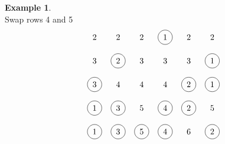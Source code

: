 \documentclass[reqno]{amsart}
\newcommand{\0}{\phantom{c}}
\theoremstyle{plain}
\theoremstyle{definition}
\newtheorem{example}[thm]{Example}
\numberwithin{equation}{section}
\begin{document}
\begin{example}
\[\]
Swap rows 4 and 5
\[
\begin{tikzpicture}\node at (0, 5){2};\node at (1, 5){2};\node at (2, 5){2};\node[circle, draw=black] at (3, 5){1};\node at (4, 5){2};\node at (5, 5){2};\node at (0, 4){3};\node[circle, draw=black] at (1, 4){2};\node at (2, 4){3};\node at (3, 4){3};\node at (4, 4){3};\node[circle, draw=black] at (5, 4){1};\node[circle, draw=black] at (0, 3){3};\node at (1, 3){4};\node at (2, 3){4};\node at (3, 3){4};\node[circle, draw=black] at (4, 3){2};\node[circle, draw=black] at (5, 3){1};\node[circle, draw=black] at (0, 2){1};\node[circle, draw=black] at (1, 2){3};\node at (2, 2){5};\node[circle, draw=black] at (3, 2){4};\node[circle, draw=black] at (4, 2){2};\node at (5, 2){5};\node[circle, draw=black] at (0, 1){1};\node[circle, draw=black] at (1, 1){3};\node[circle, draw=black] at (2, 1){5};\node[circle, draw=black] at (3, 1){4};\node at (4, 1){6};\node[circle, draw=black] at (5, 1){2};\end{tikzpicture}
\]
\end{example}




{}
\end{document}
